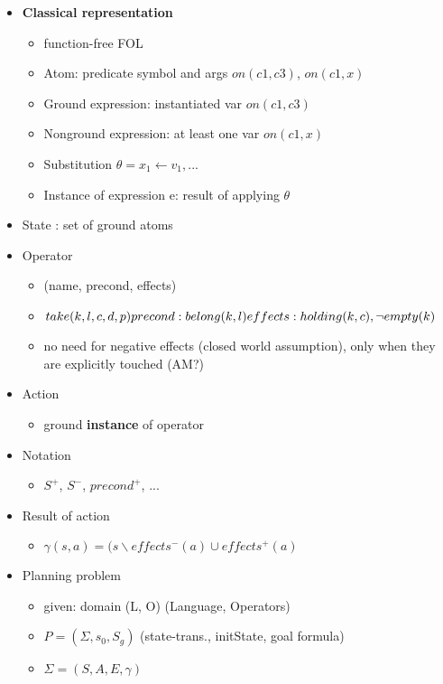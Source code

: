 \begin{itemize}
\item \textbf{Classical representation}

	\begin{itemize}
	\item function-free FOL
	\item Atom: predicate symbol and args $on(c1,c3)$, $on(c1,x)$
	\item Ground expression: instantiated var $on(c1,c3)$
	\item Nonground expression: at least one var $on(c1,x)$
	\item Substitution $\theta = {x_1 \leftarrow v_1, ... }$ 
	\item Instance of expression e: result of applying $\theta$ 
	\end{itemize}
\item State : set of ground atoms

\item Operator
	\begin{itemize}
	\item (name, precond, effects)
	\item $take(k,l,c,d,p) \\ precond: belong(k,l) \\ effects: holding(k,c), \neg empty(k) $
	\item no need for negative effects (closed world assumption), only when they are explicitly touched (AM?)
	\end{itemize}
	
\item Action
	\begin{itemize}
	\item ground \textbf{instance} of operator
	\end{itemize}
	
\item Notation
	\begin{itemize}
	\item $S^+$, $S^-$, $precond^+$, ...
	\end{itemize}

\item Result of action
	\begin{itemize}
	\item $\gamma (s,a) = ( s \backslash effects^-(a) \cup effects^+(a)$
	\end{itemize}

\item Planning problem
	\begin{itemize}
	\item given: domain (L, O) (Language, Operators)
	\item $P = (\Sigma,s_0,S_g)$ (state-trans., initState, goal formula)
	\item $\Sigma = (S,A,E,\gamma)$
	\end{itemize}


\end{itemize}
